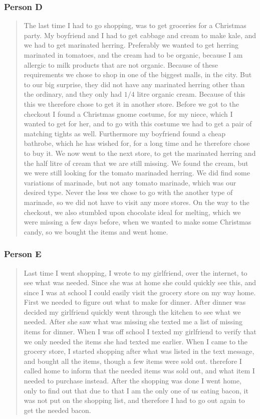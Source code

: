 \subsubsection{Person D}
\begin{quote}
The last time I had to go shopping, was to get groceries for a Christmas party. My boyfriend and I had to get cabbage and cream to make kale, and we had to get marinated herring. Preferably we wanted to get herring marinated in tomatoes, and the cream had to be organic, because I am allergic to milk products that are not organic. Because of these requirements we chose to shop in one of the biggest malls, in the city. But to our big surprise, they did not have any marinated herring other than the ordinary, and they only had $1/4$ litre organic cream. Because of this this we therefore chose to get it in another store. Before we got to the checkout I found a Christmas gnome costume, for my niece, which I wanted to get for her, and to go with this costume we had to get a pair of matching tights as well. Furthermore my boyfriend found a cheap bathrobe, which he has wished for, for a long time and he therefore chose to buy it. We now went to the next store, to get the marinated herring and the half litre of cream that we are still missing. We found the cream, but we were still looking for the tomato marinaded herring. We did find some variations of marinade, but not any tomato marinade, which was our desired type. Never the less we chose to go with the another type of marinade, so we did not have to visit any more stores. On the way to the checkout, we also stumbled upon chocolate ideal for melting, which we were missing a few days before, when we wanted to make some Christmas candy, so we bought the items and went home.
\end{quote}

\subsubsection{Person E}
\begin{quote}
Last time I went shopping, I wrote to my girlfriend, over the internet, to see what was needed. Since she was at home she could quickly see this, and since I was at school I could easily  visit the grocery store on my way home. First we needed to figure out what to make for dinner. After dinner was decided my girlfriend quickly went through the kitchen to see what we needed. After she saw what was missing she texted me a list of missing items for dinner. When I was off school I texted my girlfriend to verify that we only needed the items she had texted me earlier. When I came to the grocery store, I started shopping after what was listed in the text message, and bought all the items, though a few items were sold out.  therefore I called home to inform that the needed items was sold out, and what item I needed to purchase instead. After the shopping was done I went home, only to find out that due to that I am the only one of us eating bacon, it was not put on the shopping list, and therefore I had to go out again to get the needed bacon.
\end{quote}

